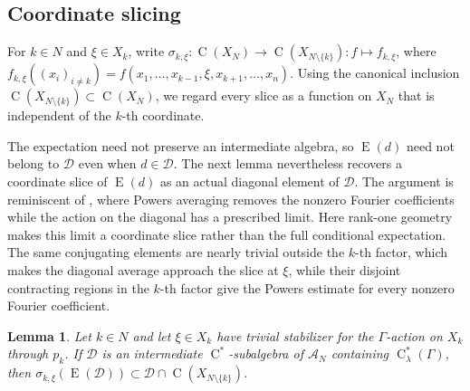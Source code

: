 \documentclass[11pt]{amsart}
\numberwithin{equation}{section}
\newcommand{\rC}{\operatorname{C}}
\newcommand{\rE}{\operatorname{E}}
\newtheorem{lemma}[theorem]{Lemma}
\theoremstyle{definition}
\begin{document}
	\subsection{Coordinate slicing}
	
	For \(k\in N\) and \(\xi\in X_k\), write \(\sigma_{k,\xi}:\rC(X_N)\to\rC(X_{N\setminus\{k\}})\colon f\mapsto f_{k,\xi}\), where \(f_{k,\xi}((x_i)_{i\neq k})=f(x_1,\ldots,x_{k-1},\xi,x_{k+1},\ldots,x_n)\). Using the canonical inclusion \(\rC(X_{N\setminus\{k\}})\subset\rC(X_N)\), we regard every slice as a function on \(X_N\) that is independent of the \(k\)-th coordinate.
	
	The expectation need not preserve an intermediate algebra, so \(\rE(d)\) need not belong to \(\mathcal D\) even when \(d\in\mathcal D\). The next lemma nevertheless recovers a coordinate slice of \(\rE(d)\) as an actual diagonal element of \(\mathcal D\). The argument is reminiscent of \cite[Lemma~3.10]{Am21}, where Powers averaging removes the nonzero Fourier coefficients while the action on the diagonal has a prescribed limit. Here rank-one geometry makes this limit a coordinate slice rather than the full conditional expectation. The same conjugating elements are nearly trivial outside the \(k\)-th factor, which makes the diagonal average approach the slice at \(\xi\), while their disjoint contracting regions in the \(k\)-th factor give the Powers estimate for every nonzero Fourier coefficient.
	
	\begin{lemma}\label{lem:coordinate-slicing}
		Let \(k\in N\) and let \(\xi\in X_k\) have trivial stabilizer for the \(\Gamma\)-action on \(X_k\) through \(p_k\). If \(\mathcal D\) is an intermediate \(\rC^*\)-subalgebra of \(\mathcal A_N\) containing \(\rC^*_\lambda(\Gamma)\), then \(\sigma_{k,\xi}(\rE(\mathcal D))\subset\mathcal D\cap\rC(X_{N\setminus\{k\}})\).
	\end{lemma}
	
\end{document}
